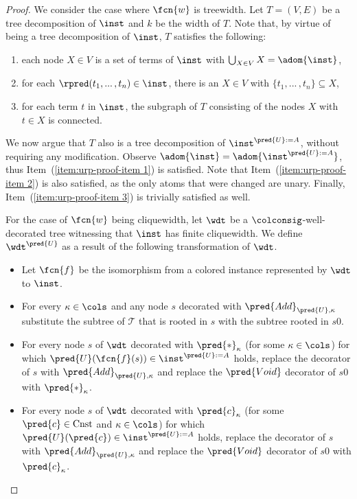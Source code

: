 \begin{proof}
We consider the case where $\fcn{w}$ is treewidth. Let $T = (V,E)$ be a tree decomposition of $\inst$ and $k$ be the width of $T$. Note that, by virtue of being a tree decomposition of $\inst$, $T$ satisfies the following:
\begin{enumerate}
	\item\label{item:urp-proof-item 1} each node $X \in V$ is a set of terms of $\inst$ with $\bigcup_{X \in V} X = \adom{\inst}$,
	\item\label{item:urp-proof-item 2} for each $\rpred(t_{1}, ...\,,t_{n}) \in \inst$, there is an $X \in V$ with $\{t_{1}, ...\,,t_{n}\} \subseteq X$,
	\item\label{item:urp-proof-item 3} for each term $t$ in $\inst$, the subgraph of $T$ consisting of the nodes $X$ with $t \in X$ is connected.
\end{enumerate}
We now argue that $T$ also is a tree de\-com\-po\-si\-tion of $\inst^{\pred{U}:=A}$, without requiring any modification.
Observe $\adom{\inst} = \adom{\inst^{\pred{U}:=A}}$, thus Item~(\ref{item:urp-proof-item 1}) is satisfied. Note that Item~(\ref{item:urp-proof-item 2}) is also satisfied, as the only atoms that were changed are unary. Finally, Item~(\ref{item:urp-proof-item 3}) is trivially satisfied as well.


\bigskip
For the case of $\fcn{w}$ being cliquewidth, let $\wdt$ be a $\colconsig$-well-decorated tree witnessing that $\inst$ has finite cliquewidth. We define $\wdt^{\pred{U}}$ as a result of the following transformation of $\wdt$.
\begin{itemize}
	\item Let $\fcn{f}$ be the isomorphism from a colored instance represented by $\wdt$ to $\inst$.
	
	\item For every $\kappa \in \cols$ and any node $s$ decorated with $\pred{Add}_{\pred{U}, \kappa}$ substitute the subtree of $\mathcal T$ that is rooted in $s$ with the subtree rooted in $s0$.
	
	\item For every node $s$ of $\wdt$ decorated with $\pred{*}_\kappa$ (for some $\kappa \in \cols$) for which $\pred{U}(\fcn{f}(s)) \in \inst^{\pred{U}:=A}$ holds, replace the decorator of $s$ with $\pred{Add}_{\pred{U}, \kappa}$ and replace the $\pred{Void}$ decorator of $s0$ with $\pred{*}_\kappa$.
	
	\item For every node $s$ of $\wdt$ decorated with $\pred{c}_\kappa$ (for some $\pred{c} \in \mathrm{Cnst}$ and $\kappa \in \cols$) for which $\pred{U}(\pred{c}) \in \inst^{\pred{U}:=A}$ holds, replace the decorator of $s$ with $\pred{Add}_{\pred{U}, \kappa}$ and replace the $\pred{Void}$ decorator of $s0$ with $\pred{c}_\kappa$.
\end{itemize}


\end{proof}
